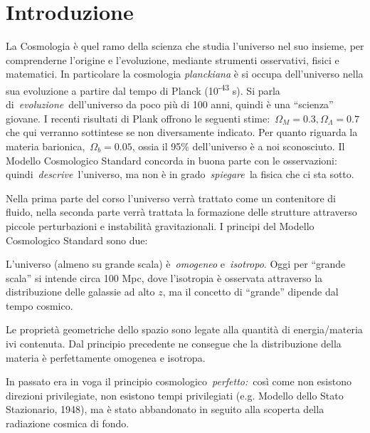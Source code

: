 \chapter{Introduzione}\label{1:chintro}

La Cosmologia è quel ramo della scienza che studia l'universo nel suo
insieme, per comprenderne l'origine e l'evoluzione, mediante strumenti
osservativi, fisici e matematici. In particolare la
cosmologia \emph{planckiana} è si occupa dell'universo nella sua
evoluzione a partire dal tempo di Planck (10\textsuperscript{-43} s). Si
parla di~\emph{evoluzione}~dell'universo da poco più di 100 anni, quindi
è una ``scienza'' giovane. I recenti risultati di Plank offrono le
seguenti stime:~\(\Omega_{M}=0.3, \Omega_{\Lambda}=0.7\) che qui verranno sottintese se non
diversamente indicato. Per quanto riguarda la materia
barionica,~\(\Omega_b=0.05\), ossia il 95\% dell'universo è a noi
sconosciuto. Il Modello Cosmologico Standard concorda in buona
parte con le osservazioni: quindi~\emph{descrive~}l'universo, ma non è
in grado~\emph{spiegare~}la fisica che ci sta sotto.

Nella prima parte del corso l'universo verrà trattato come un
contenitore di fluido, nella seconda parte verrà trattata la formazione
delle strutture attraverso piccole perturbazioni e instabilità
gravitazionali. I principi del Modello Cosmologico Standard sono due:

\begin{theorem}
L'universo (almeno su grande scala) è~\emph{omogeneo} e~\emph{isotropo}.
Oggi per ``grande scala'' si intende circa 100 Mpc, dove l'isotropia è
osservata attraverso la distribuzione delle galassie ad alto $z$, ma il
concetto di ``grande'' dipende dal tempo cosmico.\label{th:princ1}
\end{theorem}

\begin{theorem}
Le proprietà geometriche dello spazio sono legate alla quantità di
energia/materia ivi contenuta. Dal principio precedente ne consegue che
la distribuzione della materia è perfettamente omogenea e isotropa.\label{th:princ2}
\end{theorem}
In passato era in voga il principio cosmologico~\emph{perfetto:}~così
come non esistono direzioni privilegiate, non esistono tempi
privilegiati (e.g. Modello dello Stato Stazionario, 1948), ma è stato abbandonato in seguito alla scoperta della
radiazione cosmica di fondo.

